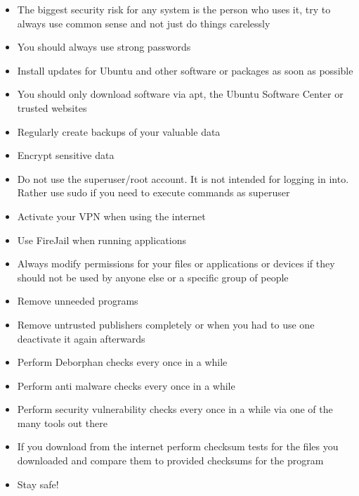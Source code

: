 \documentclass[a4paper,10pt]{article}
\begin{document}
\begin{itemize}
\item The biggest security risk for any system is the person who uses it, try to always use common sense and not just do things carelessly
\item You should always use strong passwords
\item Install updates for Ubuntu and other software or packages as soon as possible
\item You should only download software via apt, the Ubuntu Software Center or trusted websites
\item Regularly create backups of your valuable data
\item Encrypt sensitive data
\item Do not use the superuser/root account. It is not intended for logging in into. Rather use sudo if you need to execute commands as superuser
\item Activate your VPN when using the internet
\item Use FireJail when running applications
\item Always modify permissions for your files or applications or devices if they should not be used by anyone else or a specific group of people
\item Remove unneeded programs
\item Remove untrusted publishers completely or when you had to use one deactivate it again afterwards
\item Perform Deborphan checks every once in a while
\item Perform anti malware checks every once in a while
\item Perform security vulnerability checks every once in a while via one of the many tools out there
\item If you download from the internet perform checksum tests for the files you downloaded and compare them to provided checksums for the program
\item Stay safe!
\end{itemize}
\end{document}
